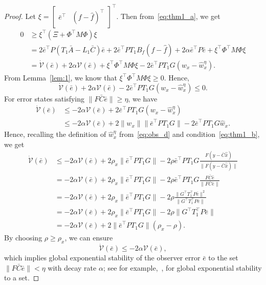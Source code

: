 \documentclass[times, doublespace]{rncauth}
\newcommand{\hb}[1]{\hat{\bar{#1}}}
\begin{document}
\begin{proof}
	Let $\xi = \begin{bmatrix}
	\bar e^\top & (f-\hat f)^\top
	\end{bmatrix}^\top$. Then from~\eqref{eq:thm1_a}, we get
	\begin{align*}
	0 &\ge \xi^\top (\Xi + \Phi^\top M\Phi) \xi \\
	&= 2\bar e^\top P (T_1 \bar A -L_1\bar C) \bar e + 2 \bar e^\top P T_1 B_f (f-\hat f) + 2\alpha \bar e^\top P \bar e + \xi^\top\Phi^\top M\Phi \xi\\
	&= \dot{\mathcal{V}}(\bar e) +2\alpha \mathcal{V}(\bar e) + \xi^\top\Phi^\top M\Phi \xi - 2\bar e^\top PT_1G (w_x-\hat w^\eta_x).
	\end{align*}
	From Lemma~\ref{lem:1}, we know that $\xi^\top\Phi^\top M\Phi \xi\ge 0$. Hence,
	\[
	\dot{\mathcal{V}}(\bar e) +2\alpha \mathcal{V}(\bar e) - 2\bar e^\top PT_1G (w_x-\hat w^\eta_x) \le 0.
	\]
	For error states satisfying $\|F\bar C\bar e\|\ge \eta$, we have
	\begin{align}
	\nonumber \dot{\mathcal{V}}(\bar e) &\le -2\alpha \mathcal{V}(\bar e) + 2\bar e^\top PT_1G (w_x-\hat w^\eta_x)\\
	&\le - 2\alpha \mathcal{V}(\bar e) + 2\|w_x\|\|\bar e^\top PT_1G\|-2\bar e^\top PT_1G\hat w_x.
	\label{pf:1_a}
	\end{align}
	Hence, recalling the definition of $\hat w_x^\eta$ from~\eqref{eq:obs_d} and condition~\eqref{eq:thm1_b}, we get
	\begin{align*}
	\dot {\mathcal V}(\bar e)&\le -2\alpha \mathcal{V}(\bar e) + 2\rho_x\|\bar e^\top PT_1G\| - 2\rho\bar e^\top PT_1G\frac{F(y-\bar C\hb x)}{\|F(y-\bar C\hb x)\|}\\
	&=-2\alpha \mathcal{V}(\bar e) + 2\rho_x \|\bar e^\top PT_1G\| - 2\rho \bar e^\top PT_1G \frac{F\bar C\bar e}{\|F\bar C\bar e\|}\\
	&=-2\alpha \mathcal{V}(\bar e) + 2\rho_x\|\bar e^\top PT_1G\| - 2\rho\frac{\|G^\top T_1^\top P \bar e\|^2}{\|G^\top T_1^\top P \bar e\|} \\
	&= -2\alpha \mathcal{V}(\bar e) + 2\rho_x\|\bar e^\top PT_1G\| - 2\rho\|G^\top T_1^\top P \bar e\|\\
	&= -2\alpha \mathcal{V}(\bar e) + 2\|\bar e^\top PT_1G\|(\rho_x-\rho).
	\end{align*}
	By choosing $\rho\ge \rho_x$, we can ensure 
	\begin{equation}
	\label{rk:exp_decay}
	\dot{\mathcal V}(\bar e)\le -2\alpha \mathcal{V}(\bar e),
	\end{equation} which implies global exponential stability of the observer error $\bar e$ to the set $\|F\bar C\bar e\| < \eta$ with decay rate $\alpha$; see for example,~\cite{Barmish1983, Corless1993}, for global exponential stability to a set.
	

\end{proof}
\end{document}
